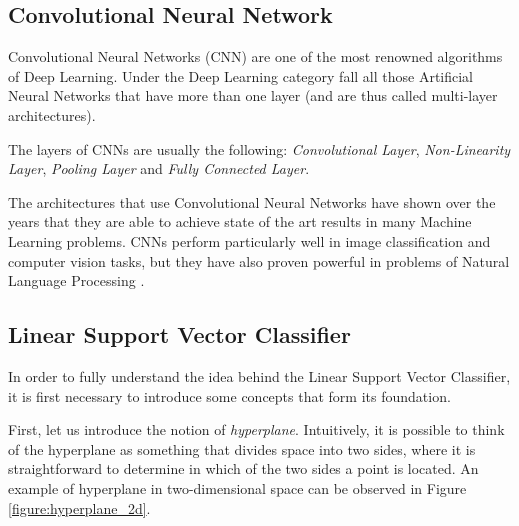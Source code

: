 \documentclass[letterpaper,11pt]{article}
\begin{document}
\subsection{Convolutional Neural Network}

Convolutional Neural Networks (CNN) are one of the most renowned algorithms of Deep Learning. Under the Deep Learning category fall all those Artificial Neural Networks that have more than one layer (and are thus called multi-layer architectures).

The layers of CNNs are usually the following: \textit{Convolutional Layer}, \textit{Non-Linearity Layer}, \textit{Pooling Layer} and \textit{Fully Connected Layer}.

The architectures that use Convolutional Neural Networks have shown over the years that they are able to achieve state of the art results in many Machine Learning problems. CNNs perform particularly well in image classification and computer vision tasks, but they have also proven powerful in problems of Natural Language Processing \cite{Albawi2017UnderstandingOA}.

\subsection{Linear Support Vector Classifier}

In order to fully understand the idea behind the Linear Support Vector Classifier, it is first necessary to introduce some concepts that form its foundation.

First, let us introduce the notion of \textit{hyperplane}. Intuitively, it is possible to think of the hyperplane as something that divides space into two sides, where it is straightforward to determine in which of the two sides a point is located. An example of hyperplane in two-dimensional space can be observed in Figure \ref{figure:hyperplane_2d}.
\end{document}
